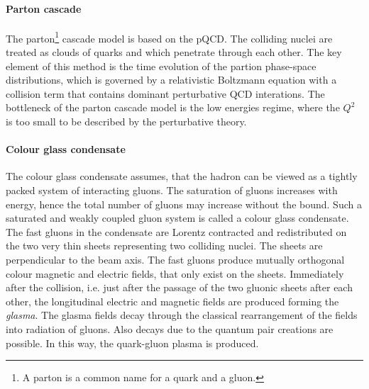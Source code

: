       \paragraph{Parton cascade}
      The parton\footnote{A parton is a common name for a quark and a gluon.} cascade model is based on the pQCD.
      The colliding nuclei are treated as clouds of quarks and which penetrate through each other.
      The key element of this method is the time evolution of the partion phase-space distributions, which is governed by a relativistic Boltzmann equation with a collision term that contains dominant perturbative QCD interations.
      The bottleneck of the parton cascade model is the low energies regime, where the $Q^2$ is too small to be described by the perturbative theory.
      \paragraph{Colour glass condensate}
      The colour glass condensate assumes, that the hadron can be viewed as a tightly packed system of interacting gluons.
      The saturation of gluons increases with energy, hence the total number of gluons may increase without the bound.
      Such a saturated and weakly coupled gluon system is called a colour glass condensate.
      The fast gluons in the condensate are Lorentz contracted and redistributed on the two very thin sheets representing two colliding nuclei.
      The sheets are perpendicular to the beam axis.
      The fast gluons produce mutually orthogonal colour magnetic and electric fields, that only exist on the sheets.
      Immediately after the collision, i.e. just after the passage of the two gluonic sheets after each other, the longitudinal electric and magnetic fields are produced forming the \textit{glasma}.
      The glasma fields decay through the classical rearrangement of the fields into radiation of gluons.
      Also decays due to the quantum pair creations are possible.
      In this way, the quark-gluon plasma is produced.



